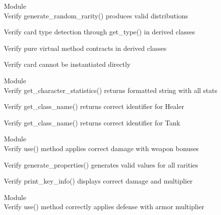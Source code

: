\begin{DoxyRefList}
\item[Module \doxylink{group___card}{Card} ]\hfill \\
\label{test__test000003}%
%
Verify generate\+\_\+random\+\_\+rarity() produces valid distributions  



\label{test__test000004}%
%
Verify card type detection through get\+\_\+type() in derived classes  



\label{test__test000005}%
%
Verify pure virtual method contracts in derived classes  



\label{test__test000006}%
%
Verify card cannot be instantiated directly  


\item[Module \doxylink{group___character}{Character} ]\hfill \\
\label{test__test000103}%
%
Verify get\+\_\+character\+\_\+statistics() returns formatted string with all stats  



\label{test__test000104}%
%
Verify get\+\_\+class\+\_\+name() returns correct identifier for Healer  



\label{test__test000105}%
%
Verify get\+\_\+class\+\_\+name() returns correct identifier for Tank  


\item[Module \doxylink{group___creature_card}{Creature\+Card} ]\hfill \\
\label{test__test000037}%
%
Verify use() method applies correct damage with weapon bonuses  



\label{test__test000038}%
%
Verify generate\+\_\+properties() generates valid values for all rarities  



\label{test__test000039}%
%
Verify print\+\_\+key\+\_\+info() displays correct damage and multiplier  


\item[Module \doxylink{group___defence_spell}{Defence\+Spell} ]\hfill \\
\label{test__test000028}%
%
Verify use() method correctly applies defense with armor multiplier  




\end{DoxyRefList}
